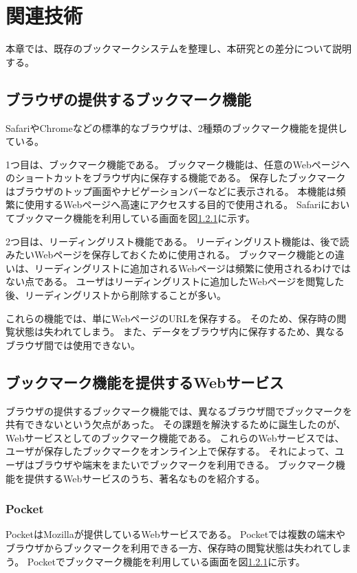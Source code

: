 \chapter{関連技術}
\label{chap:related_works}

本章では、既存のブックマークシステムを整理し、本研究との差分について説明する。

\section{ブラウザの提供するブックマーク機能}
SafariやChromeなどの標準的なブラウザは、2種類のブックマーク機能を提供している。

1つ目は、ブックマーク機能である。
ブックマーク機能は、任意のWebページへのショートカットをブラウザ内に保存する機能である。
保存したブックマークはブラウザのトップ画面やナビゲーションバーなどに表示される。
本機能は頻繁に使用するWebページへ高速にアクセスする目的で使用される。
Safariにおいてブックマーク機能を利用している画面を図\ref{}に示す。

2つ目は、リーディングリスト機能である。
リーディングリスト機能は、後で読みたいWebページを保存しておくために使用される。
ブックマーク機能との違いは、リーディングリストに追加されるWebページは頻繁に使用されるわけではない点である。
ユーザはリーディングリストに追加したWebページを閲覧した後、リーディングリストから削除することが多い。

これらの機能では、単にWebページのURLを保存する。
そのため、保存時の閲覧状態は失われてしまう。
また、データをブラウザ内に保存するため、異なるブラウザ間では使用できない。

\section{ブックマーク機能を提供するWebサービス}

ブラウザの提供するブックマーク機能では、異なるブラウザ間でブックマークを共有できないという欠点があった。
その課題を解決するために誕生したのが、Webサービスとしてのブックマーク機能である。
これらのWebサービスでは、ユーザが保存したブックマークをオンライン上で保存する。
それによって、ユーザはブラウザや端末をまたいでブックマークを利用できる。
ブックマーク機能を提供するWebサービスのうち、著名なものを紹介する。

\subsection{Pocket}
PocketはMozilla\cite{}が提供しているWebサービスである。
Pocketでは複数の端末やブラウザからブックマークを利用できる一方、保存時の閲覧状態は失われてしまう。
Pocketでブックマーク機能を利用している画面を図\ref{}に示す。

